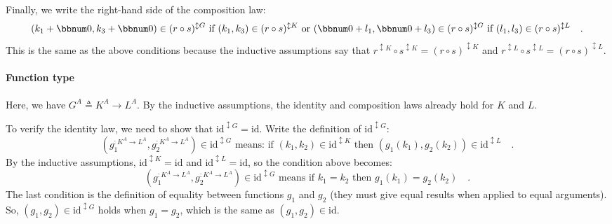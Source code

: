 Finally, we write the right-hand side of the composition law:
\[
(k_{1}+\bbnum 0,k_{3}+\bbnum 0)\in(r\circ s)^{\updownarrow G}\text{ if }(k_{1},k_{3})\in(r\circ s)^{\updownarrow K}\text{ or }(\bbnum 0+l_{1},\bbnum 0+l_{3})\in(r\circ s)^{\updownarrow G}\text{ if }(l_{1},l_{3})\in(r\circ s)^{\updownarrow L}\quad.
\]
This is the same as the above conditions because the inductive assumptions
say that $r^{\updownarrow K}\circ s^{\updownarrow K}=(r\circ s)^{\updownarrow K}$
and $r^{\updownarrow L}\circ s^{\updownarrow L}=(r\circ s)^{\updownarrow L}$.

\paragraph{Function type}

Here, we have $G^{A}\triangleq K^{A}\rightarrow L^{A}$. By the inductive
assumptions, the identity and composition laws already hold for $K$
and $L$.

To verify the identity law, we need to show that $\text{id}^{\updownarrow G}=\text{id}$.
Write the definition of $\text{id}^{\updownarrow G}$:
\[
(g_{1}^{:K^{A}\rightarrow L^{A}},g_{2}^{:K^{A}\rightarrow L^{A}})\in\text{id}^{\updownarrow G}\text{ means: if }(k_{1},k_{2})\in\text{id}^{\updownarrow K}\text{ then }(g_{1}(k_{1}),g_{2}(k_{2}))\in\text{id}^{\updownarrow L}\quad.
\]
By the inductive assumptions, $\text{id}^{\updownarrow K}=\text{id}$
and $\text{id}^{\updownarrow L}=\text{id}$, so the condition above
becomes:
\[
(g_{1}^{:K^{A}\rightarrow L^{A}},g_{2}^{:K^{A}\rightarrow L^{A}})\in\text{id}^{\updownarrow G}\text{ means if }k_{1}=k_{2}\text{ then }g_{1}(k_{1})=g_{2}(k_{2})\quad.
\]
The last condition is the definition of equality between functions
$g_{1}$ and $g_{2}$ (they must give equal results when applied to
equal arguments). So, $(g_{1},g_{2})\in\text{id}^{\updownarrow G}$
holds when $g_{1}=g_{2}$, which is the same as $(g_{1},g_{2})\in\text{id}$.

